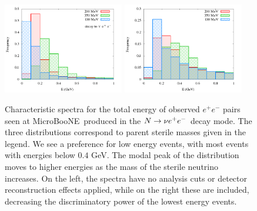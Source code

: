 \documentclass[11pt, a4paper]{article}
\def\muboone{MicroBooNE}
\def\ster{\ensuremath N}
\begin{document}
\begin{figure}[t]
%
\center
%
\includegraphics[width=0.47\textwidth]{figures/spectrum_ee.png} \includegraphics[width=0.47\textwidth]{figures/spectrum_ee_cuts.png}
%
\caption{\label{fig:spectrum_ee} Characteristic spectra for the total energy of observed  $e^+e^-$ pairs seen at \muboone\ produced in the $\ster \to \nu e^+e^-$ decay mode. The three distributions correspond to parent sterile masses given in the legend. We see a preference for low energy events, with most events with energies below $0.4$ GeV. The modal peak of the distribution moves to higher energies as the mass of the sterile neutrino increases. On the left, the spectra have no analysis cuts or detector reconstruction effects applied, while on the right these are included, decreasing the discriminatory power of the lowest energy events.}
%
\end{figure}
\end{document}
